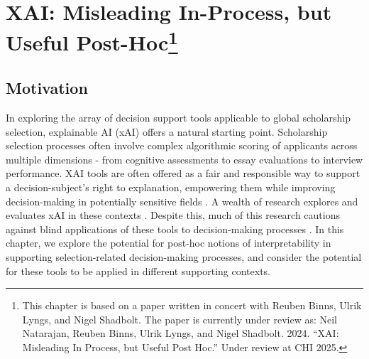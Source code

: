 \chapter[XAI]{\label{ch:xai}XAI: Misleading In-Process, but Useful Post-Hoc\footnote{This chapter is based on a paper written in concert with Reuben Binns, Ulrik Lyngs, and Nigel Shadbolt. The paper is currently under review as: Neil Natarajan, Reuben Binns, Ulrik Lyngs, and Nigel Shadbolt. 2024. ``XAI: Misleading In Process, but Useful Post Hoc.'' Under review at CHI 2025.}}

\minitoc


\section{Motivation}
In exploring the array of decision support tools applicable to global scholarship selection, explainable AI (xAI) offers a natural starting point. Scholarship selection processes often involve complex algorithmic scoring of applicants across multiple dimensions - from cognitive assessments to essay evaluations to interview performance. XAI tools are often offered as a fair and responsible way to support a decision-subject's right to explanation, empowering them while improving decision-making in potentially sensitive fields \cite{Goodman_Flaxman_2017}. A wealth of research explores and evaluates xAI in these contexts \cite{molnar_interpretable_2019,barocas_hidden_2020,wachter_counterfactual_2017,Barocas_Hood_Ziewitz_2013,raghavan2020mitigating}. Despite this, much of this research cautions against blind applications of these tools to decision-making processes \cite{Lipton,miller_explainable_2023,kumar_problems_2020,Bastounis_Campodonico_vanderSchaar_Adcock_Hansen_2024}. In this chapter, we explore the potential for post-hoc notions of interpretability in supporting selection-related decision-making processes, and consider the potential for these tools to be applied in different supporting contexts.

